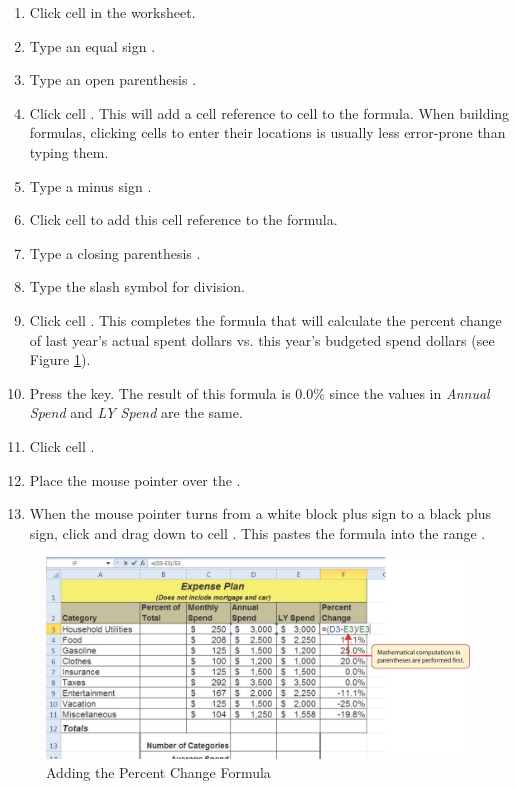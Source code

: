 \begin{enumerate}
	\item Click cell  in the  worksheet.
	\item Type an equal sign \fmtTyping{=}.
	\item Type an open parenthesis \fmtTyping{(}.
	\item Click cell . This will add a cell reference to cell  to the formula. When building formulas, clicking cells to enter their locations is usually less error-prone than typing them.
	\item Type a minus sign \fmtTyping{-}.
	\item Click cell  to add this cell reference to the formula.
	\item Type a closing parenthesis \fmtTyping{)}.
	\item Type the slash \fmtTyping{/} symbol for division.
	\item Click cell . This completes the formula that will calculate the percent change of last year's actual spent dollars vs. this year's budgeted spend dollars (see Figure \ref{02:fig06}).
	\item Press the  key. The result of this formula is $ 0.0\% $ since the values in \textit{Annual Spend} and \textit{LY Spend} are the same.
	\item Click cell .
	\item Place the mouse pointer over the .
	\item When the mouse pointer turns from a white block plus sign to a black plus sign, click and drag down to cell . This pastes the formula into the range .
\end{enumerate}

\begin{figure}[H]
	\centering
	\includegraphics[width=\maxwidth{.95\linewidth}]{gfx/ch02_fig06}
	\caption{Adding the Percent Change Formula}
	\label{02:fig06}
\end{figure}

